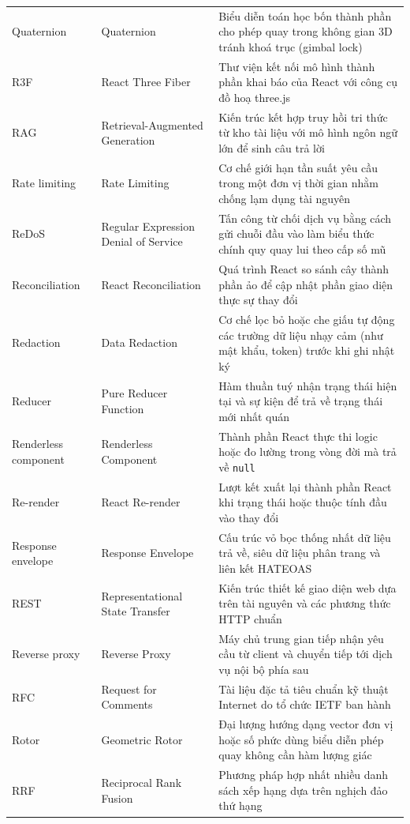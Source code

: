 {\begin{longtable}{@{}>{\raggedright\arraybackslash}p{3.4cm}>{\raggedright\arraybackslash}p{4.7cm}>{\raggedright\arraybackslash}p{7.15cm}@{}}
    Quaternion & Quaternion & Biểu diễn toán học bốn thành phần cho phép quay trong không gian 3D tránh khoá trục (gimbal lock) \\
    R3F & React Three Fiber & Thư viện kết nối mô hình thành phần khai báo của React với công cụ đồ hoạ three.js \\
    RAG & Retrieval-Augmented Generation & Kiến trúc kết hợp truy hồi tri thức từ kho tài liệu với mô hình ngôn ngữ lớn để sinh câu trả lời \\
    Rate limiting & Rate Limiting & Cơ chế giới hạn tần suất yêu cầu trong một đơn vị thời gian nhằm chống lạm dụng tài nguyên \\
    ReDoS & Regular Expression Denial of Service & Tấn công từ chối dịch vụ bằng cách gửi chuỗi đầu vào làm biểu thức chính quy quay lui theo cấp số mũ \\
    Reconciliation & React Reconciliation & Quá trình React so sánh cây thành phần ảo để cập nhật phần giao diện thực sự thay đổi \\
    Redaction & Data Redaction & Cơ chế lọc bỏ hoặc che giấu tự động các trường dữ liệu nhạy cảm (như mật khẩu, token) trước khi ghi nhật ký \\
    Reducer & Pure Reducer Function & Hàm thuần tuý nhận trạng thái hiện tại và sự kiện để trả về trạng thái mới nhất quán \\
    Renderless component & Renderless Component & Thành phần React thực thi logic hoặc đo lường trong vòng đời mà trả về \texttt{null} \\
    Re-render & React Re-render & Lượt kết xuất lại thành phần React khi trạng thái hoặc thuộc tính đầu vào thay đổi \\
    Response envelope & Response Envelope & Cấu trúc vỏ bọc thống nhất dữ liệu trả về, siêu dữ liệu phân trang và liên kết HATEOAS \\
    REST & Representational State Transfer & Kiến trúc thiết kế giao diện web dựa trên tài nguyên và các phương thức HTTP chuẩn \\
    Reverse proxy & Reverse Proxy & Máy chủ trung gian tiếp nhận yêu cầu từ client và chuyển tiếp tới dịch vụ nội bộ phía sau \\
    RFC & Request for Comments & Tài liệu đặc tả tiêu chuẩn kỹ thuật Internet do tổ chức IETF ban hành \\
    Rotor & Geometric Rotor & Đại lượng hướng dạng vector đơn vị hoặc số phức dùng biểu diễn phép quay không cần hàm lượng giác \\
    RRF & Reciprocal Rank Fusion & Phương pháp hợp nhất nhiều danh sách xếp hạng dựa trên nghịch đảo thứ hạng \\

\end{longtable}}
